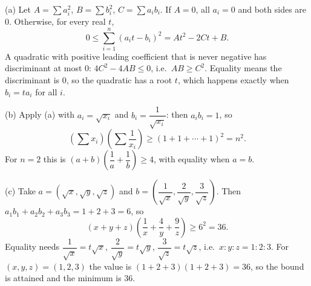 (a) Let $A=\sum a_i^2$, $B=\sum b_i^2$, $C=\sum a_ib_i$. If $A=0$, all $a_i=0$ and both sides are $0$. Otherwise, for every real $t$,
\[
0\le\sum_{i=1}^{n}(a_it-b_i)^2=At^2-2Ct+B .
\]
A quadratic with positive leading coefficient that is never negative has discriminant at most $0$: $4C^2-4AB\le0$, i.e.\ $AB\ge C^2$. Equality means the discriminant is $0$, so the quadratic has a root $t$, which happens exactly when $b_i=ta_i$ for all $i$.

(b) Apply (a) with $a_i=\sqrt{x_i}$ and $b_i=\dfrac{1}{\sqrt{x_i}}$: then $a_ib_i=1$, so
\[
\left(\sum x_i\right)\left(\sum\dfrac{1}{x_i}\right)\ge(1+1+\cdots+1)^2=n^2 .
\]
For $n=2$ this is $(a+b)\left(\dfrac{1}{a}+\dfrac{1}{b}\right)\ge4$, with equality when $a=b$.

(c) Take $a=\left(\sqrt x,\sqrt y,\sqrt z\right)$ and $b=\left(\dfrac{1}{\sqrt x},\dfrac{2}{\sqrt y},\dfrac{3}{\sqrt z}\right)$. Then $a_1b_1+a_2b_2+a_3b_3=1+2+3=6$, so
\[
(x+y+z)\left(\dfrac{1}{x}+\dfrac{4}{y}+\dfrac{9}{z}\right)\ge6^2=36 .
\]
Equality needs $\dfrac{1}{\sqrt x}=t\sqrt x$, $\dfrac{2}{\sqrt y}=t\sqrt y$, $\dfrac{3}{\sqrt z}=t\sqrt z$, i.e.\ $x:y:z=1:2:3$. For $(x,y,z)=(1,2,3)$ the value is $(1+2+3)\left(1+2+3\right)=36$, so the bound is attained and the minimum is $\boxed{36}$.
